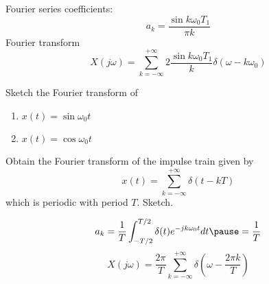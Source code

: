 \begin{frame}
    {
        Fourier series coefficients:
        \begin{equation*}
            a_k = \frac{\sin k\omega_0 T_1}{\pi k}
        \end{equation*}
        \pause
        Fourier transform\\
        \begin{equation*}
            X(j\omega) = \sum_{k=-\infty}^{+\infty}  2\frac{\sin k\omega_0 T_1}{ k}\delta (\omega - k\omega_0)
        \end{equation*}

    }
\end{frame}


\begin{frame}
     \begin{center}
        
    \end{center}
\end{frame}

\begin{frame}
    \begin{example}
        Sketch the Fourier transform of
        \begin{enumerate}
            \item $x(t) = \sin\omega_0 t$
            \item $x(t) = \cos\omega_0 t$
        \end{enumerate}
    \end{example}
\end{frame}


\begin{frame}
    \begin{example}
        Obtain the Fourier transform of the impulse train given by
        \begin{equation*}
            x(t) = \sum_{k=-\infty}^{+\infty}  \delta(t - kT)
        \end{equation*}
        which is periodic with period $T$. Sketch.
    \end{example}
    {
        \begin{equation*}
            a_k = \frac{1}{T}\int_{-T/2}^{T/2}\delta(t)e^{-jk\omega_0 t} dt \pause = \frac{1}{T}
        \end{equation*}
        \pause
        \begin{equation*}
            X(j\omega) = \dfrac{2\pi}{T}\sum_{k=-\infty}^{+\infty}\delta\left(\omega - \dfrac{2\pi k}{T}\right)
        \end{equation*}

    }
\end{frame}

